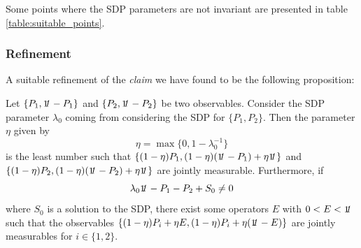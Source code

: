 \documentclass[10pt, a4paper]{amsart}
\begin{document}
Some points where the SDP parameters are not invariant are presented in table \ref{table:suitable_points}. 








\newpage

\subsubsection{Refinement}
A suitable refinement of the \textit{claim} we have found to be the following proposition:

\begin{proposition}\label{proposition:refinement}
   Let $\{P_{1},\mathit{\bbone} - P_{1}\}$  and $\{P_{2}, \mathit{\bbone} - P_{2}\}$ be two observables. 
   Consider the SDP parameter $\lambda_{0} $ coming from considering the SDP for $\{P_{1}, P_{2}\}$. Then the parameter $\eta$ given by  
   $$
\eta  = \max \{0 , 1- \lambda_{0}^{-1}\}   
  $$
is the least number such that $\{(1-\eta) P_{1}, (1-\eta)(\mathit{\bbone} - P_{1}) + \eta \mathit{\bbone}\}$ and $\{(1-\eta) P_{2}, (1-\eta)(\mathit{\bbone} - P_{2}) + \eta \mathit{\bbone}\}$ are jointly measurable. Furthermore, if 
$$
\lambda_{0} \mathit{\bbone} - P _{1} - P_{2} + S_{0} \neq 0
$$ 
where $S_{0}$ is a solution to the SDP, 
there exist some operators $E$ with $0< E< \mathit{\bbone}$ such that the observables 
$\{(1-\eta) P_{i} + \eta E , (1-\eta)P_{i} + \eta (\mathit{\bbone} - E)\}$ are jointly measurables for $i\in\{1,2\}$. 
\end{proposition}
\end{document}
